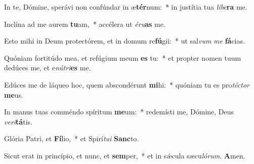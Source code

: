 ﻿In te, Dómine, sperávi non confúndar in æ\textbf{tér}num:~* in justítia tua \textit{lí}\textit{be}\textbf{ra} me.

Inclína ad me aurem \textbf{tu}am,~* accélera ut \textit{é}\textit{ru}\textbf{as} me.

Esto mihi in Deum protectórem, et in domum re\textbf{fú}gii:~* ut sal\textit{vum} \textit{me} \textbf{fá}cias.

Quóniam fortitúdo mea, et refúgium meum \textbf{es} tu:~* et propter nomen tuum dedúces me, et e\textit{nú}\textit{tri}\textbf{es} me.

Edúces me de láqueo hoc, quem abscondérunt \textbf{mi}hi:~* quóniam tu es pro\textit{téc}\textit{tor} \textbf{me}us.

In manus tuas comméndo spíritum \textbf{me}um:~* redemísti me, Dómine, Deus \textit{ve}\textit{ri}\textbf{tá}tis.

Glória Patri, et \textbf{Fí}lio,~* et Spirí\textit{tu}\textit{i} \textbf{Sanc}to.

Sicut erat in princípio, et nunc, et \textbf{sem}per,~* et in sǽcula sæcu\textit{ló}\textit{rum}. \textbf{A}men.